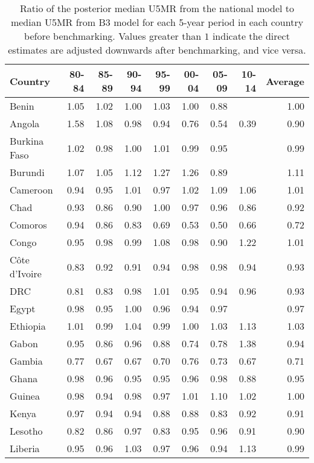 \documentclass[12pt]{article}\usepackage[]{graphicx}\usepackage[]{color}
\begin{document}
\begin{table}[htbp]
\centering
\caption{Ratio of the posterior median U5MR from the national model to median U5MR from B3 model for each 5-year period in each country before benchmarking. Values greater than $1$ indicate the direct estimates are adjusted downwards after benchmarking, and vice versa.}
\label{tab:benchmark}
\begin{tabular}{lrrrrrrrr}
  \hline
 Country & 80-84 & 85-89 & 90-94 & 95-99 & 00-04 & 05-09 & 10-14 & Average \\ 
  \toprule
  Benin & 1.05 & 1.02 & 1.00 & 1.03 & 1.00 & 0.88 &  & 1.00 \\ 
  Angola & 1.58 & 1.08 & 0.98 & 0.94 & 0.76 & 0.54 & 0.39 & 0.90 \\ 
  Burkina Faso & 1.02 & 0.98 & 1.00 & 1.01 & 0.99 & 0.95 &  & 0.99 \\ 
  Burundi & 1.07 & 1.05 & 1.12 & 1.27 & 1.26 & 0.89 &  & 1.11 \\ 
  Cameroon & 0.94 & 0.95 & 1.01 & 0.97 & 1.02 & 1.09 & 1.06 & 1.01 \\ 
  Chad & 0.93 & 0.86 & 0.90 & 1.00 & 0.97 & 0.96 & 0.86 & 0.92 \\ 
  Comoros & 0.94 & 0.86 & 0.83 & 0.69 & 0.53 & 0.50 & 0.66 & 0.72 \\ 
  Congo & 0.95 & 0.98 & 0.99 & 1.08 & 0.98 & 0.90 & 1.22 & 1.01 \\ 
  C\^{o}te d'Ivoire & 0.83 & 0.92 & 0.91 & 0.94 & 0.98 & 0.98 & 0.94 & 0.93 \\ 
  DRC & 0.81 & 0.83 & 0.98 & 1.01 & 0.95 & 0.94 & 0.96 & 0.93 \\ 
  Egypt & 0.98 & 0.95 & 1.00 & 0.96 & 0.94 & 0.97 &  & 0.97 \\ 
  Ethiopia & 1.01 & 0.99 & 1.04 & 0.99 & 1.00 & 1.03 & 1.13 & 1.03 \\ 
  Gabon & 0.95 & 0.86 & 0.96 & 0.88 & 0.74 & 0.78 & 1.38 & 0.94 \\ 
  Gambia & 0.77 & 0.67 & 0.67 & 0.70 & 0.76 & 0.73 & 0.67 & 0.71 \\ 
  Ghana & 0.98 & 0.96 & 0.95 & 0.95 & 0.96 & 0.98 & 0.88 & 0.95 \\ 
  Guinea & 0.98 & 0.94 & 0.98 & 0.97 & 1.01 & 1.10 & 1.02 & 1.00 \\ 
  Kenya & 0.97 & 0.94 & 0.94 & 0.88 & 0.88 & 0.83 & 0.92 & 0.91 \\ 
  Lesotho & 0.82 & 0.86 & 0.97 & 0.83 & 0.95 & 0.96 & 0.91 & 0.90 \\ 
  Liberia & 0.95 & 0.96 & 1.03 & 0.97 & 0.96 & 0.94 & 1.13 & 0.99 \\ 

\end{tabular}
\end{table}
\end{document}

